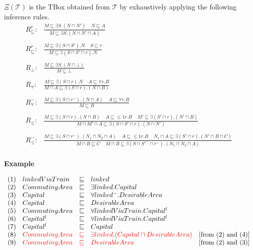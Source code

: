 \documentclass[oneside]{book}
\newcommand{\T}{\mathcal{T}}
\newcommand{\dlisa}{\sqsubseteq}
\newcommand{\dland}{\sqcap}
\begin{document}
$\Xi(\T)$ is the TBox obtained from $\T$ by exhaustively applying the following inference
rules.
\[
\begin{array}{ll}
%
R^c_\dlisa: & \frac{M \dlisa \exists S.(N \dland N')  \;\;\;\; N \dlisa A}{M \dlisa \exists S.(N \dland N' \dland A)}  \\
\\
R^r_\dlisa: & \frac{M \dlisa \exists (S \dland S').N  \;\;\;\; S \dlisa r}{M \dlisa \exists (S \dland S' \dland r).N}  \\
\\
R_\bot: & \frac{M \dlisa \exists S.(N \dland \bot)}{M \dlisa \bot} \\ 	%
\\
R_\forall: & \frac{M \dlisa \exists (S \dland r).N  \;\;\;\; A \dlisa \forall r.B}{M \dland A \dlisa \exists (S \dland r).(N \dland B)}  \\	
\\
R^-_\forall: & \frac{M \dlisa \exists (S \dland r^-).(N\dland A)  \;\;\;\; A \dlisa \forall r.B}{M \dlisa B} \\
\\
R_\leq: & \frac{M \dlisa \exists (S \dland r).(N \dland B)  \;\;\;\; A \dlisa \leq 1r.B \;\;\;\; M' \dlisa \exists(S' \dland r).(N' \dland B)}{M \dland M' \dland A \dlisa \exists(S \dland S' \dland r).(N \dland N')} \\
\\
R^-_\leq: & \frac{M \dlisa \exists (S \dland r^-).(N_1 \dland N_2 \dland A)  \;\;\;\; A \dlisa \leq 1r.B \;\;\;\; N_1 \dland A \dlisa \exists(S' \dland r).(N' \dland B \dland C)}{M \dland B \dlisa C \;\;\;\; M \dland B \dlisa \exists(S \dland S'^- \dland r^-).(N_1 \dland N_2 \dland A)}  \\
%
\end{array}	
\]


\textbf{Example}

\[
\begin{array}{lllll}
(1) & linkedViaTrain & \dlisa & linked & \\
(2) & CommutingArea & \dlisa & \exists linked.Capital & \\
(3) & Capital & \dlisa & \forall linked^-.DesirableArea \\
(4) & Capital & \dlisa & DesirableArea & \\
(5) & CommutingArea & \dlisa & \forall linkedViaTrain.Capital^l & \\
(6) & Capital^l & \dlisa & \forall linkedViaTrain.Capital^l & \\
(7) & Capital^l & \dlisa & Capital & \\
(8) & \color{red}{CommutingArea} & \color{red}{\dlisa} & \color{red}{\exists linked.(Capital \dland DesirableArea)} & \text{[from (2) and (4)]} \\
(9) & \color{red}{CommutingArea} & \color{red}{\dlisa} & \color{red}{DesirableArea} & \text{[from (2) and (3)]} \\
%
\end{array}
\]
\end{document}
